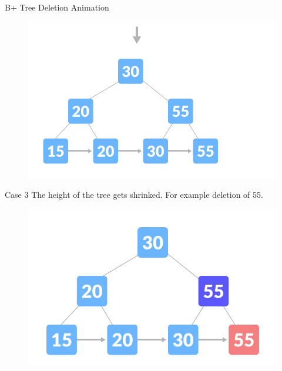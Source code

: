 \documentclass{beamer}
\begin{document}
\begin{frame}{B+ Tree Deletion Animation}
\begin{table}[h]
\begin{overprint}
\begin{figure}
        \end{figure}
        \begin{figure}
            \centering
             \includegraphics[scale=0.4]{Images/deletion-5.4.png}
        \end{figure}
        \begin{block}{Case 3}
            The height of the tree gets shrinked. For example deletion of 55.
        \end{block}
        \begin{figure}
             \centering
             \includegraphics[scale=0.4]{Images/deletion-6.1.png}
        \end{figure}
        \begin{figure}
            \centering

\end{figure}
\end{overprint}
\end{table}
\end{frame}
\end{document}
